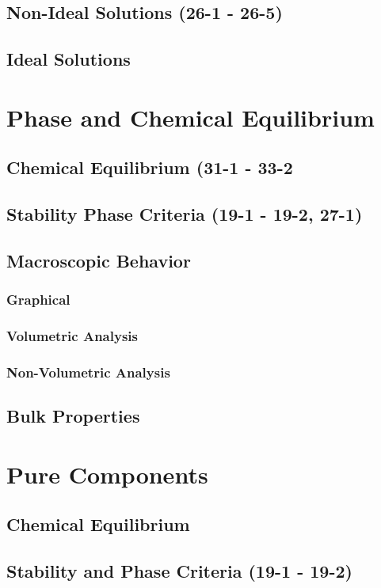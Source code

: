 \documentclass{mitqualif}
\begin{document}
\subsection{Non-Ideal Solutions (26-1 - 26-5)}
\subsection{Ideal Solutions}
\section{Phase and Chemical Equilibrium}
\subsection{Chemical Equilibrium (31-1 - 33-2}
\subsection{Stability Phase Criteria (19-1 - 19-2, 27-1)}
\subsection{Macroscopic Behavior}
\subsubsection{Graphical}
\subsubsection{Volumetric Analysis}
\subsubsection{Non-Volumetric Analysis}
\subsection{Bulk Properties}
\section{Pure Components}
\subsection{Chemical Equilibrium}
\subsection{Stability and Phase Criteria (19-1 - 19-2)}
\end{document}
